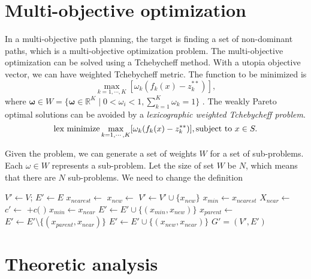 \documentclass[paper=a4, fontsize=11pt]{scrartcl}
\begin{document}
\section{Multi-objective optimization}

In a multi-objective path planning, the target is finding a set of non-dominant paths, which is a multi-objective optimization problem.
The multi-objective optimization can be solved using a Tchebycheff method.
With a utopia objective vector, we can have weighted Tchebycheff metric.
The function to be minimized is  
\begin{equation}
\max_{k=1, \cdots , K} [ \omega_{k}  ( f_{k} (x) - z^{**}_{k} ) ],
\end{equation}
where $ \mathbf{\omega} \in W = \{ \mathbf{\omega} \in \mathbf{\mathbb{R}}^{K} \mid 0 < \omega_{i} < 1 , \sum^{K}_{k=1} \omega_{k} = 1 \} $ .
The weakly Pareto optimal solutions can be avoided by a \emph{lexicographic weighted Tchebycheff problem}.
\begin{equation}
\mbox{lex minimize} \max_{k=1, \cdots , K} [ \omega_{k}  ( f_{k} (x) - z^{**}_{k} ) ], \\
\mbox{subject to } x \in S.
\end{equation}

Given the problem, we can generate a set of weights $ W $ for a set of sub-problems.
Each $ \omega \in W $ represents a sub-problem.
Let the size of set $ W $ be $ N $, which means that there are $ N $ sub-problems.
We need to change the definition 

\begin{algorithm}
\begin{algorithmic}[1]
\State $ V' \leftarrow V $; $ E' \leftarrow E $
\State $ x_{nearest} \leftarrow $ 
\State $ x_{new} \leftarrow $ 
\State $ V' \leftarrow V' \cup \{ x_{new} \} $
\State $ x_{min} \leftarrow x_{nearest} $
\State $ X_{near} \leftarrow $ 
\State $ c' \leftarrow $  $ + c( $  $ ) $ 
\State $ x_{min} \leftarrow x_{near} $
\EndIf
\EndIf
\EndFor
\State $ E' \leftarrow E' \cup \{ ( x_{min}, x_{new} ) \} $
\State $ x_{parent} \leftarrow $ 
\State $ E' \leftarrow E' \setminus \{ ( x_{parent}, x_{near} ) \} $
\State $ E' \leftarrow E' \cup \{ ( x_{new}, x_{near} ) \} $
\EndIf
\EndFor
\EndIf
\Return $ G' = (V', E') $ 
\end{algorithmic}
\label{alg:mo_rrtstar_extend}
\caption{ $ \mbox{Extend}_{MORRT^{*}} (G, x) $}
\end{algorithm}

\section{Theoretic analysis}



\end{document}
